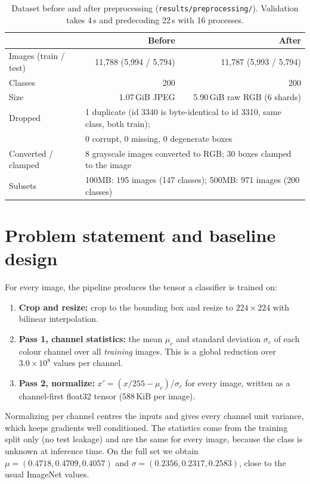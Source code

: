 \documentclass{zc-ust-hw}
\begin{document}
\begin{table}[H]
\centering\small
\begin{tabular}{lrr}
\toprule
 & Before & After \\
\midrule
Images (train / test) & 11{,}788 (5{,}994 / 5{,}794) & 11{,}787 (5{,}993 / 5{,}794) \\
Classes & 200 & 200 \\
Size & 1.07\,GiB JPEG & 5.90\,GiB raw RGB (6 shards) \\
\midrule
Dropped & \multicolumn{2}{l}{1 duplicate (id 3340 is byte-identical to id 3310, same class, both train);} \\
 & \multicolumn{2}{l}{0 corrupt, 0 missing, 0 degenerate boxes} \\
Converted / clamped & \multicolumn{2}{l}{8 grayscale images converted to RGB; 30 boxes clamped to the image} \\
\midrule
Subsets & \multicolumn{2}{l}{100MB: 195 images (147 classes); 500MB: 971 images (200 classes)} \\
\bottomrule
\end{tabular}
\caption{Dataset before and after preprocessing (\texttt{results/preprocessing/}).
Validation takes 4\,s and predecoding 22\,s with 16 processes.}
\end{table}

\section{Problem statement and baseline design}\label{sec:problem}

For every image, the pipeline produces the tensor a classifier is trained on:
\begin{enumerate}
  \item \textbf{Crop and resize:} crop to the bounding box and resize to $224\times224$
    with bilinear interpolation.
  \item \textbf{Pass 1, channel statistics:} the mean $\mu_c$ and standard deviation $\sigma_c$
    of each colour channel over all \emph{training} images. This is a global reduction over
    $3.0\times10^8$ values per channel.
  \item \textbf{Pass 2, normalize:} $x' = (x/255-\mu_c)/\sigma_c$ for every image, written as
    a channel-first float32 tensor (588\,KiB per image).
\end{enumerate}
Normalizing per channel centres the inputs and gives every channel unit variance, which keeps
gradients well conditioned. The statistics come from the training split only (no test leakage)
and are the same for every image, because the class is unknown at inference time. On the full
set we obtain $\mu = (0.4718, 0.4709, 0.4057)$ and $\sigma = (0.2356, 0.2317, 0.2583)$,
close to the usual ImageNet values.
\end{document}
